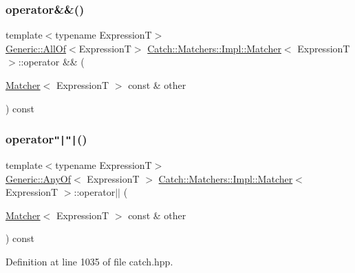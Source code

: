 \subsubsection{\texorpdfstring{operator\&\&()}{operator\&\&()}}
{\footnotesize\ttfamily template$<$typename ExpressionT$>$ \\
\hyperlink{class_catch_1_1_matchers_1_1_impl_1_1_generic_1_1_all_of}{Generic\+::\+All\+Of}$<$ExpressionT$>$ \hyperlink{struct_catch_1_1_matchers_1_1_impl_1_1_matcher}{Catch\+::\+Matchers\+::\+Impl\+::\+Matcher}$<$ ExpressionT $>$\+::operator \&\& (\begin{DoxyParamCaption}\item[{\hyperlink{struct_catch_1_1_matchers_1_1_impl_1_1_matcher}{Matcher}$<$ ExpressionT $>$ const \&}]{other }\end{DoxyParamCaption}) const}

\hypertarget{struct_catch_1_1_matchers_1_1_impl_1_1_matcher_a55b1e12315e7a5daf7ce7a11ddfaa295}{}\label{struct_catch_1_1_matchers_1_1_impl_1_1_matcher_a55b1e12315e7a5daf7ce7a11ddfaa295} 
\subsubsection{\texorpdfstring{operator\texttt{"|}\texttt{"|}()}{operator||()}}
{\footnotesize\ttfamily template$<$typename ExpressionT$>$ \\
\hyperlink{class_catch_1_1_matchers_1_1_impl_1_1_generic_1_1_any_of}{Generic\+::\+Any\+Of}$<$ ExpressionT $>$ \hyperlink{struct_catch_1_1_matchers_1_1_impl_1_1_matcher}{Catch\+::\+Matchers\+::\+Impl\+::\+Matcher}$<$ ExpressionT $>$\+::operator$\vert$$\vert$ (\begin{DoxyParamCaption}\item[{\hyperlink{struct_catch_1_1_matchers_1_1_impl_1_1_matcher}{Matcher}$<$ ExpressionT $>$ const \&}]{other }\end{DoxyParamCaption}) const}



Definition at line 1035 of file catch.\+hpp.

\hypertarget{struct_catch_1_1_matchers_1_1_impl_1_1_matcher_a091bcc37e589967d7e10fc7790d820e2}{}\label{struct_catch_1_1_matchers_1_1_impl_1_1_matcher_a091bcc37e589967d7e10fc7790d820e2} 
